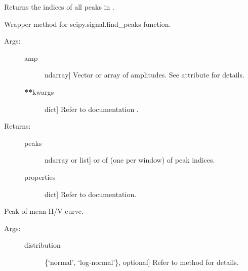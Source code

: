 \documentclass[letterpaper,10pt,english,openany,oneside]{sphinxmanual}
\begin{document}
\begin{fulllineitems}
\begin{fulllineitems}
\begin{description}
\end{description}

\end{fulllineitems}


\begin{fulllineitems}
\label{\detokenize{index:hvsrpy.Hvsr.find_peaks}}
Returns the indices of all peaks in .

Wrapper method for scipy.signal.find\_peaks function.
\begin{description}
\item[{Args:}] \leavevmode\begin{description}
\item[{amp}] \leavevmode{[}ndarray{]}
Vector or array of amplitudes. See  attribute for 
details.

\item[{{\color{red}\bfseries{}**}kwargs}] \leavevmode{[}dict{]}
Refer to  documentation
.

\end{description}

\item[{Returns:}] \leavevmode\begin{description}
\item[{peaks}] \leavevmode{[}ndarray or list{]}
 or  of  (one per window) of
peak indices.

\item[{properties}] \leavevmode{[}dict{]}
Refer to  documentation.

\end{description}

\end{description}

\end{fulllineitems}


\begin{fulllineitems}
\label{\detokenize{index:hvsrpy.Hvsr.mc_peak}}
Peak of mean H/V curve.
\begin{description}
\item[{Args:}] \leavevmode\begin{description}
\item[{distribution}] \leavevmode{[}\{‘normal’, ‘log-normal’\}, optional{]}
Refer to method  for details.


\end{description}
\end{description}
\end{fulllineitems}
\end{fulllineitems}
\end{document}
